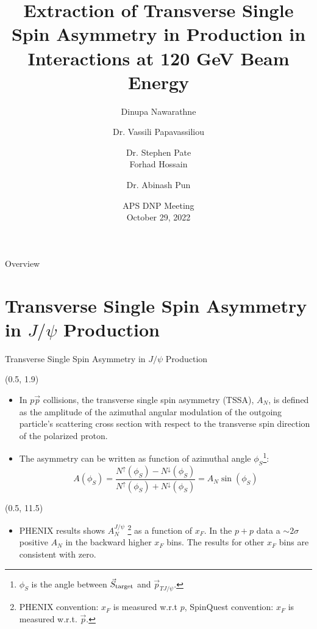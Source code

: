\documentclass[10pt, xcolor={dvipsnames}, aspectratio = 169]{beamer}
\title{Extraction of Transverse Single Spin Asymmetry in \jpsi Production in \pp Interactions at 120 GeV Beam Energy}
\author{Dinupa Nawarathne  \and Dr. Vassili Papavassiliou \and Dr. Stephen Pate \\ Forhad Hossain \and Dr. Abinash Pun}
\institute{New Mexico State University \\
Representing the E-1039/SpinQuest
Collaboration}
\date{APS DNP Meeting
\\ October 29, 2022 }
\newcommand{\citeme}[1]{{\tiny \footfullcite{#1}}}
\newcommand{\jpsi}{$J/\psi$ }
\newcommand{\pp}{$p\vec{p}$ }
\begin{document}
%
%
\begin{frame}
\maketitle
\end{frame}

%
%
\begin{frame}{Overview}
\tableofcontents
\end{frame}

%
%
\section{Transverse Single Spin Asymmetry in \jpsi Production}

\begin{frame}{Transverse Single Spin Asymmetry in \jpsi Production}

\begin{textblock}{8.0}(0.5, 1.9)

\begin{itemize}

\item In \pp collisions, the transverse single spin asymmetry (TSSA), $A_{N}$, is defined as the amplitude of the
azimuthal angular modulation of the outgoing particle’s scattering cross section with respect to the transverse spin
direction of the polarized proton.

\item The asymmetry can be written as function of azimuthal angle $\phi_{S}$\footnote{\tiny {$\phi_{S}$ is the angle
between $\vec{S}_{\rm target}$ and $\vec{p}_{TJ/\psi}$}.}:
%
\begin{equation*}
    A(\phi_{S}) = \frac{N^{\uparrow}(\phi_{S}) - N^{\downarrow}(\phi_{S})}{N^{\uparrow}(\phi_{S}) + N^{\downarrow}(\phi_{S})} = A_{N}\sin(\phi_{S})
\end{equation*}
%
%
\end{itemize}
\end{textblock}

\begin{textblock}{15.0}(0.5, 11.5)
\begin{itemize}
\item PHENIX results\citeme{PHENIX:2018qvl} shows $A_{N}^{J/\psi}$ \footnote{\tiny{PHENIX convention: $x_{F}$ is measured w.r.t $p$, SpinQuest convention: $x_{F}$ is measured w.r.t. $\vec{p}$.}} as a function of $x_{F}$. In the $p+p$ data a $\sim 2\sigma$ positive $A_{N}$ in the backward higher $x_{F}$ bins. The results for other $x_{F}$ bins are consistent with zero.
\end{itemize}
\end{textblock}


\end{frame}
\end{document}
